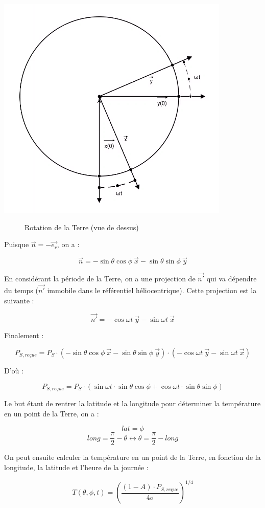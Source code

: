 \documentclass[a4paper,11pt]{article}
\begin{document}
\begin{adjustbox}{center}
\includegraphics[scale=0.5]{projete_omega_t}
\end{adjustbox}
\begin{figure}[h]
  \centering
  \caption{Rotation de la Terre (vue de dessus)}
\end{figure}
 
Puisque $ \vec{n} = -\overrightarrow{e_r}$, on a :

\[ \vec{n} = - \sin \theta \cos \phi ~ \vec{x} - \sin \theta \sin \phi ~ \vec{y} \]

En considérant la période de la Terre, on a une projection de $\vec{n'}$ qui va dépendre du temps ($\vec{n'}$ immobile dans le référentiel héliocentrique). Cette projection est la suivante :

\[ \vec{n'} = - \cos \omega t ~ \vec{y} - \sin \omega t ~ \vec{x} \]

Finalement :

\[ P_{S,reçue} = P_S \cdot (- \sin \theta \cos \phi ~ \vec{x} - \sin \theta \sin \phi ~ \vec{y}) \cdot (- \cos \omega t ~ \vec{y} - \sin \omega t ~ \vec{x}) \]

D'où :

\[ P_{S,reçue} = P_S \cdot (\sin \omega t \cdot \sin \theta \cos \phi + \cos \omega t \cdot \sin \theta \sin \phi) \]

Le but étant de rentrer la latitude et la longitude pour déterminer la température en un point de la Terre, on a :

\[ lat = \phi \]
\[ long = \dfrac{\pi}{2} - \theta \leftrightarrow \theta = \dfrac{\pi}{2} - long \]

On peut ensuite calculer la température en un point de la Terre, en fonction de la longitude, la latitude et l'heure de la journée :

\[ T (\theta , \phi , t) = \left(\dfrac{(1 - A) \cdot P_{S,reçue}}{4\sigma}\right)^{1/4} \]
\end{document}
